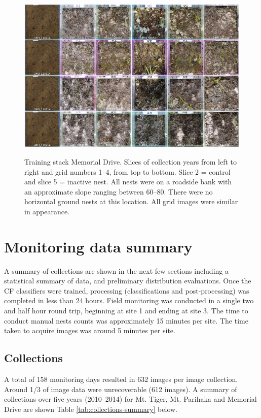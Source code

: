 \begin{figure}\myfloatalign
\includegraphics[width=1\linewidth]{gfx6/train/train-m3} \\
\caption[Training stack Memorial Drive.]{Training stack Memorial Drive. Slices of collection years from left to right and grid numbers 1--4, from top to bottom. Slice 2 = control and slice 5 = inactive nest. All nests were on a roadside bank with an approximate slope ranging between 60--80\textdegree. There were no horizontal ground nests at this location. All grid images were similar in appearance.}\label{fig:train-m3}
\end{figure}

\section{Monitoring data summary}\label{sec:monitoring-data-summary}
A summary of collections are shown in the next few sections including a statistical summary of data, and preliminary distribution evaluations. Once the CF classifiers were trained, processing (classifications and post-processing) was completed in less than 24 hours. Field monitoring was conducted in a single two and half hour round trip, beginning at site 1 and ending at site 3. The time to conduct manual nests counts was approximately 15 minutes per site. The time taken to acquire images was around 5 minutes per site.

\subsection{Collections}\label{sec:collections}
A total of 158 monitoring days resulted in 632 images per image collection. Around 1/3 of image data were unrecoverable (612 images). A summary of collections over five years (2010--2014) for Mt. Tiger, Mt. Parihaka and Memorial Drive are shown Table \ref{tab:collections-summary} below.

